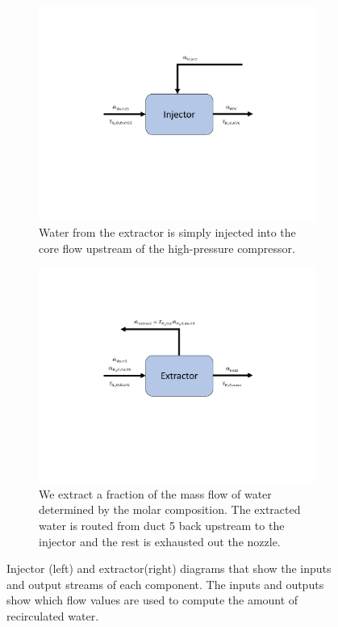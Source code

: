 \documentclass[conf]{new-aiaa}
\begin{document}
\begin{figure}[hbt!]
  \centering
  \begin{subfigure}[t]{0.49\textwidth}
    \includegraphics[width=\textwidth]{injector.pdf}
    \caption{
      Water from the extractor is simply injected into the core flow upstream of the high-pressure compressor.
    }
    \label{fig:injector}
  \end{subfigure}
  \hspace{2pt}
  \begin{subfigure}[t]{0.49\textwidth}
    \includegraphics[width=\textwidth]{extractor.pdf}
    \caption{
      We extract a fraction of the mass flow of water determined by the molar composition.
      The extracted water is routed from duct 5 back upstream to the injector and the rest is exhausted out the nozzle.
    }
    \label{fig:extractor}
  \end{subfigure}
  \caption{Injector (left) and extractor(right) diagrams that show the inputs and output streams of each component.
    The inputs and outputs show which flow values are used to compute the amount of recirculated water.}
  \label{fig:extract_inject}
\end{figure}
\end{document}
